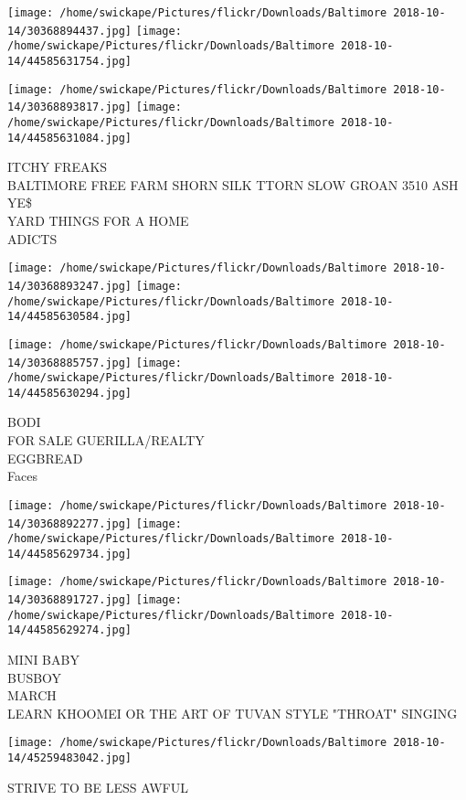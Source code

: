 \documentclass[10pt,letterpaper]{article}
\begin{document}
\texttt{[image: /home/swickape/Pictures/flickr/Downloads/Baltimore 2018-10-14/30368894437.jpg]}
\texttt{[image: /home/swickape/Pictures/flickr/Downloads/Baltimore 2018-10-14/44585631754.jpg]}

\texttt{[image: /home/swickape/Pictures/flickr/Downloads/Baltimore 2018-10-14/30368893817.jpg]}
\texttt{[image: /home/swickape/Pictures/flickr/Downloads/Baltimore 2018-10-14/44585631084.jpg]}

ITCHY FREAKS\\
BALTIMORE FREE FARM SHORN SILK TTORN SLOW GROAN 3510 ASH YE\$\\
YARD THINGS FOR A HOME\\
ADICTS
\pagebreak

\texttt{[image: /home/swickape/Pictures/flickr/Downloads/Baltimore 2018-10-14/30368893247.jpg]}
\texttt{[image: /home/swickape/Pictures/flickr/Downloads/Baltimore 2018-10-14/44585630584.jpg]}

\texttt{[image: /home/swickape/Pictures/flickr/Downloads/Baltimore 2018-10-14/30368885757.jpg]}
\texttt{[image: /home/swickape/Pictures/flickr/Downloads/Baltimore 2018-10-14/44585630294.jpg]}

BODI\\
FOR SALE GUERILLA/REALTY\\
EGGBREAD\\
Faces
\pagebreak

\texttt{[image: /home/swickape/Pictures/flickr/Downloads/Baltimore 2018-10-14/30368892277.jpg]}
\texttt{[image: /home/swickape/Pictures/flickr/Downloads/Baltimore 2018-10-14/44585629734.jpg]}

\texttt{[image: /home/swickape/Pictures/flickr/Downloads/Baltimore 2018-10-14/30368891727.jpg]}
\texttt{[image: /home/swickape/Pictures/flickr/Downloads/Baltimore 2018-10-14/44585629274.jpg]}

MINI BABY\\
BUSBOY\\
MARCH\\
LEARN KHOOMEI OR THE ART OF TUVAN STYLE "THROAT" SINGING
\pagebreak

\texttt{[image: /home/swickape/Pictures/flickr/Downloads/Baltimore 2018-10-14/45259483042.jpg]}

STRIVE TO BE LESS AWFUL
\pagebreak
\end{document}
